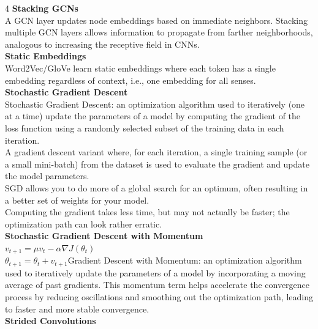 \documentclass[8pt]{extarticle}
\begin{document}
\begin{multicols}{4}
{\vspace{2pt}\textbf{Stacking GCNs}\\
A GCN layer updates node embeddings based on immediate neighbors. Stacking multiple GCN layers allows information to propagate from farther neighborhoods, analogous to increasing the receptive field in CNNs.\\
\vspace{2pt}\textbf{Static Embeddings}\\
Word2Vec/GloVe learn static embeddings where each token has a single embedding regardless of context, i.e., one embedding for all senses.\\
\vspace{2pt}\textbf{Stochastic Gradient Descent}\\
Stochastic Gradient Descent: an optimization algorithm used to iteratively (one at a time) update the parameters of a model by computing the gradient of the loss function using a randomly selected subset of the training data in each iteration.\\
A gradient descent variant where, for each iteration, a single training sample (or a small mini-batch) from the dataset is used to evaluate the gradient and update the model parameters.\\
SGD allows you to do more of a global search for an optimum, often resulting in a better set of weights for your model.\\
Computing the gradient takes less time, but may not actually be faster; the optimization path can look rather erratic.\\
\vspace{2pt}\textbf{Stochastic Gradient Descent with Momentum}\\
$v_{t+1} = \mu v_t - \alpha \nabla J(\theta_t)$\\
$\theta_{t+1} = \theta_t + v_{t+1}$\Stochastic Gradient Descent with Momentum: an optimization algorithm used to iteratively update the parameters of a model by incorporating a moving average of past gradients. This momentum term helps accelerate the convergence process by reducing oscillations and smoothing out the optimization path, leading to faster and more stable convergence.\\
\vspace{2pt}\textbf{Strided Convolutions}\\

}
\end{multicols}
\end{document}
